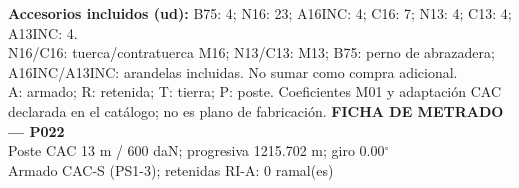 \begingroup\scriptsize
\textbf{Accesorios incluidos (ud):} B75: 4; N16: 23; A16INC: 4; C16: 7; N13: 4; C13: 4; A13INC: 4.\\
N16/C16: tuerca/contratuerca M16; N13/C13: M13; B75: perno de abrazadera; A16INC/A13INC: arandelas incluidas. No sumar como compra adicional.\\
A: armado; R: retenida; T: tierra; P: poste. Coeficientes M01 y adaptación CAC declarada en el catálogo; no es plano de fabricación.
\endgroup\endgroup
\clearpage{}
\begingroup\small\setlength{\parskip}{3pt}\renewcommand{\arraystretch}{1.05}
\textbf{\large FICHA DE METRADO — P022}\\[4pt]
Poste CAC 13 m / 600 daN; progresiva 1215.702 m; giro 0.00\ensuremath{^\circ}\\
Armado CAC-S (PS1-3); retenidas RI-A: 0 ramal(es)\\
\begingroup\scriptsize
